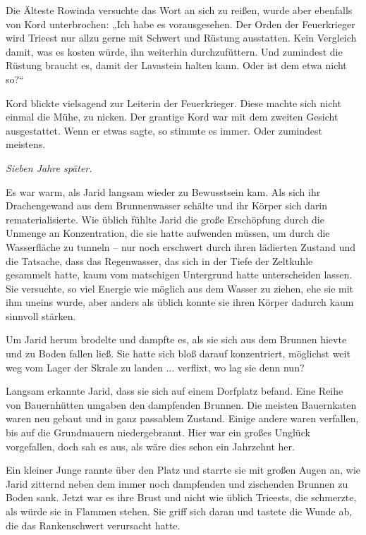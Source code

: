 Die Älteste Rowinda versuchte das Wort an sich zu reißen, wurde aber ebenfalls von Kord unterbrochen: „Ich habe es vorausgesehen. Der Orden der Feuerkrieger wird Trieest nur allzu gerne mit Schwert und Rüstung ausstatten. Kein Vergleich damit, was es kosten würde, ihn weiterhin durchzufüttern. Und zumindest die Rüstung braucht es, damit der Lavastein halten kann. Oder ist dem etwa nicht so?“

Kord blickte vielsagend zur Leiterin der Feuerkrieger. Diese machte sich nicht einmal die Mühe, zu nicken. Der grantige Kord war mit dem zweiten Gesicht ausgestattet. Wenn er etwas sagte, so stimmte es immer. Oder zumindest meistens.








\textit{Sieben Jahre später.}\bigskip




Es war warm, als Jarid langsam wieder zu Bewusstsein kam. Als sich ihr Drachengewand aus dem Brunnenwasser schälte und ihr Körper sich darin rematerialisierte. Wie üblich fühlte Jarid die große Erschöpfung durch die Unmenge an Konzentration, die sie hatte aufwenden müssen, um durch die Wasserfläche zu tunneln – nur noch erschwert durch ihren lädierten Zustand und die Tatsache, dass das Regenwasser, das sich in der Tiefe der Zeltkuhle gesammelt hatte, kaum vom matschigen Untergrund hatte unterscheiden lassen. Sie versuchte, so viel Energie wie möglich aus dem Wasser zu ziehen, ehe sie mit ihm uneins wurde, aber anders als üblich konnte sie ihren Körper dadurch kaum sinnvoll stärken.

Um Jarid herum brodelte und dampfte es, als sie sich aus dem Brunnen hievte und zu Boden fallen ließ. Sie hatte sich bloß darauf konzentriert, möglichst weit weg vom Lager der Skrale zu landen ... verflixt, wo lag sie denn nun?

Langsam erkannte Jarid, dass sie sich auf einem Dorfplatz befand. Eine Reihe von Bauernhütten umgaben den dampfenden Brunnen. Die meisten Bauernkaten waren neu gebaut und in ganz passablem Zustand. Einige andere waren verfallen, bis auf die Grundmauern niedergebrannt. Hier war ein großes Unglück vorgefallen, doch sah es aus, als wäre dies schon ein Jahrzehnt her.

Ein kleiner Junge rannte über den Platz und starrte sie mit großen Augen an, wie Jarid zitternd neben dem immer noch dampfenden und zischenden Brunnen zu Boden sank. Jetzt war es ihre Brust und nicht wie üblich Trieests, die schmerzte, als würde sie in Flammen stehen. Sie griff sich daran und tastete die Wunde ab, die das Rankenschwert verursacht hatte.

